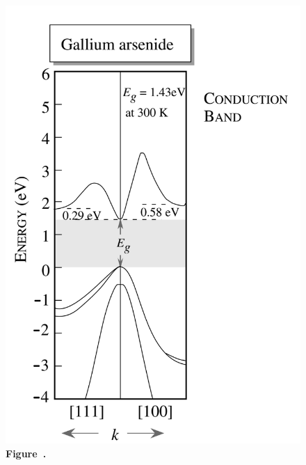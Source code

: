 \begin{figure}[h!]
	\centering
	\begin{minipage}{0.36\textwidth}
		\centering
		\includegraphics[width=\textwidth]{img/Gallium.png}
		\\[0.5em]
		\textbf{Figure~\thefigure.}
		\label{fig:Gallium}
	\end{minipage}%
	\hfill
	\begin{minipage}{0.64\textwidth}
		\centering

\end{minipage}
\end{figure}
